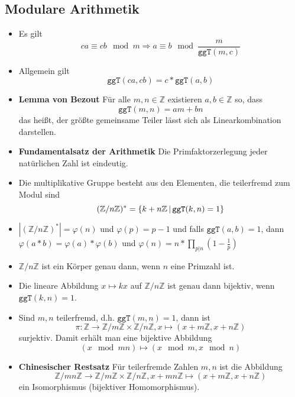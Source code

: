 \documentclass[landscape, 8pt, a4paper]{extarticle}
\newcommand{\ggT}{\texttt{ggT}}
\newcommand{\Z}{\mathbb{Z}}
\newcommand{\set}[2]{\ensuremath\left\{ #1 \,\middle|\, #2 \right\}}
\begin{document}
\begin{multicols}{3}
	\section{Modulare Arithmetik}
	\begin{itemize}
		\item Es gilt
		\begin{equation*}
			ca\equiv cb\mod m\Rightarrow a\equiv b\mod \frac{m}{\ggT(m,c)}
		\end{equation*}

		\item Allgemein gilt
		\begin{equation*}
			\ggT(ca,cb)=c*\ggT(a,b)
		\end{equation*}
		\item \textbf{Lemma von Bezout}
		Für alle $m,n\in\Z$ existieren $a,b\in\Z$ so, dass
		\begin{equation*}
			\ggT(m,n)=am+bn
		\end{equation*}
		das heißt, der größte gemeinsame Teiler lässt sich als Linearkombination darstellen.
		\item \textbf{Fundamentalsatz der Arithmetik} Die Primfaktorzerlegung jeder natürlichen Zahl ist eindeutig.
		\item Die multiplikative Gruppe besteht aus den Elementen, die teilerfremd zum Modul sind
		\begin{equation*}
			(\Z/n\Z)^\ast =\set{k+n\Z}{\ggT(k,n)=1}
		\end{equation*}

		\item $|(\Z/n\Z)^\ast|=\varphi(n)$ und $\varphi(p)=p-1$ und falls $\ggT(a,b)=1$, dann $ \varphi(a*b)=\varphi(a)*\varphi(b)$ und $\varphi(n)=n*\prod_{p|n}(1-\frac1p)$

		\item $\Z/n\Z$ ist ein Körper genau dann, wenn $n$ eine Primzahl ist.

		\item Die lineare Abbildung $x\mapsto kx$ auf $\Z/n\Z$ ist genau dann bijektiv, wenn $\ggT(k,n)=1$.
		
		\item Sind $m,n$ teilerfremd, d.h. $\ggT(m,n)=1$, dann ist
		\begin{equation*}
			\pi:\Z\rightarrow\Z/m\Z\times\Z/n\Z, x\mapsto(x+m\Z,x+n\Z)
		\end{equation*}
		surjektiv. Damit erhält man eine bijektive Abbildung
		\begin{equation*}
			(x\mod mn)\mapsto (x\mod m,x\mod n)
		\end{equation*}
		\item \textbf{Chinesischer Restsatz}
		Für teilerfremde Zahlen $m,n$ ist die Abbildung
		\begin{equation*}
			\Z/mn\Z\rightarrow \Z/m\Z\times \Z/n\Z, 
			x+mn\Z\mapsto (x+m\Z,x+n\Z)
		\end{equation*}
		ein Isomorphismus (bijektiver Homomorphismus).


\end{itemize}
\end{multicols}
\end{document}

